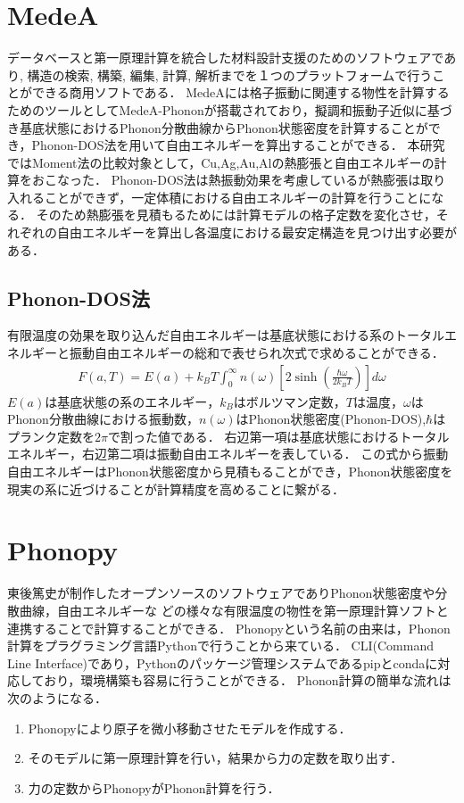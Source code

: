 \section{MedeA}
データベースと第一原理計算を統合した材料設計支援のためのソフトウェアであり, 
構造の検索, 構築, 編集, 計算, 解析までを１つのプラットフォームで行うことができる商用ソフトである．
MedeAには格子振動に関連する物性を計算するためのツールとしてMedeA-Phononが搭載されており，擬調和振動子近似に基づき基底状態におけるPhonon分散曲線からPhonon状態密度を計算することができ，Phonon-DOS法を用いて自由エネルギーを算出することができる．
本研究ではMoment法の比較対象として，Cu,Ag,Au,Alの熱膨張と自由エネルギーの計算をおこなった．
Phonon-DOS法は熱振動効果を考慮しているが熱膨張は取り入れることができず，一定体積における自由エネルギーの計算を行うことになる．
そのため熱膨張を見積もるためには計算モデルの格子定数を変化させ，それぞれの自由エネルギーを算出し各温度における最安定構造を見つけ出す必要がある．
\subsection{Phonon-DOS法}
有限温度の効果を取り込んだ自由エネルギーは基底状態における系のトータルエネルギーと振動自由エネルギーの総和で表せられ次式で求めることができる\cite{kittel}．
\begin{eqnarray}
\label{eq:phonon}
F(a,T)=E(a)+k_BT\int_0^\infty n(\omega)\left[
2\sinh\left(\frac{\hbar\omega}{2k_BT}\right)
\right]d\omega
\end{eqnarray}
$E(a)$は基底状態の系のエネルギー，$k_B$はボルツマン定数，$T$は温度，$\omega$はPhonon分散曲線における振動数，$n(\omega)$はPhonon状態密度(Phonon-DOS),$\hbar$はプランク定数を$2\pi$で割った値である．
右辺第一項は基底状態におけるトータルエネルギー，右辺第二項は振動自由エネルギーを表している．
この式から振動自由エネルギーはPhonon状態密度から見積もることができ，Phonon状態密度を現実の系に近づけることが計算精度を高めることに繋がる．

\section{Phonopy}
東後篤史が制作したオープンソースのソフトウェアでありPhonon状態密度や分散曲線，自由エネルギーな
どの様々な有限温度の物性を第一原理計算ソフトと連携することで計算することができる\cite{phonopy}．
Phonopyという名前の由来は，Phonon計算をプラグラミング言語Pythonで行うことから来ている．
CLI(Command Line Interface)であり，Pythonのパッケージ管理システムであるpipとcondaに対応しており，環境構築も容易に行うことができる．
Phonon計算の簡単な流れは次のようになる．
\begin{enumerate}
 \item Phonopyにより原子を微小移動させたモデルを作成する．
 \item そのモデルに第一原理計算を行い，結果から力の定数を取り出す．
 \item 力の定数からPhonopyがPhonon計算を行う．
\end{enumerate}


